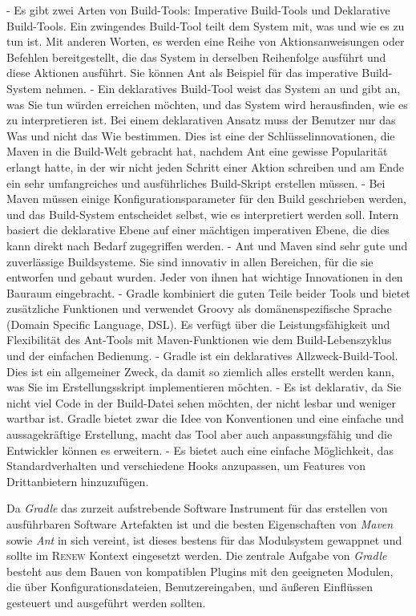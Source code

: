 		- Es gibt zwei Arten von Build-Tools: Imperative Build-Tools und Deklarative Build-Tools. Ein zwingendes Build-Tool teilt dem System mit, was und wie es zu tun ist. Mit anderen Worten, es werden eine Reihe von Aktionsanweisungen oder Befehlen bereitgestellt, die das System in derselben Reihenfolge ausführt und diese Aktionen ausführt. Sie können Ant als Beispiel für das imperative Build-System nehmen. 
		- Ein deklaratives Build-Tool weist das System an und gibt an, was Sie tun würden erreichen möchten, und das System wird herausfinden, wie es zu interpretieren ist. Bei einem deklarativen Ansatz muss der Benutzer nur das Was und nicht das Wie bestimmen. Dies ist eine der Schlüsselinnovationen, die Maven in die Build-Welt gebracht hat, nachdem Ant eine gewisse Popularität erlangt hatte, in der wir nicht jeden Schritt einer Aktion schreiben und am Ende ein sehr umfangreiches und ausführliches Build-Skript erstellen müssen. 
		- Bei Maven müssen einige Konfigurationsparameter für den Build geschrieben werden, und das Build-System entscheidet selbst, wie es interpretiert werden soll. Intern basiert die deklarative Ebene auf einer mächtigen imperativen Ebene, die dies kann direkt nach Bedarf zugegriffen werden. 
		- Ant und Maven sind sehr gute und zuverlässige Buildsysteme. Sie sind innovativ in allen Bereichen, für die sie entworfen und gebaut wurden. Jeder von ihnen hat wichtige Innovationen in den Bauraum eingebracht. 
		- Gradle kombiniert die guten Teile beider Tools und bietet zusätzliche Funktionen und verwendet Groovy als domänenspezifische Sprache (Domain Specific Language, DSL). Es verfügt über die Leistungsfähigkeit und Flexibilität des Ant-Tools mit Maven-Funktionen wie dem Build-Lebenszyklus und der einfachen Bedienung. 
		- Gradle ist ein deklaratives Allzweck-Build-Tool. Dies ist ein allgemeiner Zweck, da damit so ziemlich alles erstellt werden kann, was Sie im Erstellungsskript implementieren möchten. 
		- Es ist deklarativ, da Sie nicht viel Code in der Build-Datei sehen möchten, der nicht lesbar und weniger wartbar ist. Gradle bietet zwar die Idee von Konventionen und eine einfache und aussagekräftige Erstellung, macht das Tool aber auch anpassungsfähig und die Entwickler können es erweitern. 
		- Es bietet auch eine einfache Möglichkeit, das Standardverhalten und verschiedene Hooks anzupassen, um Features von Drittanbietern hinzuzufügen.


		Da \textit{Gradle} das zurzeit aufstrebende Software Instrument für das erstellen von ausführbaren Software Artefakten ist und die besten Eigenschaften von \textit{Maven} sowie \textit{Ant} in sich vereint, ist dieses bestens für das Modulsystem gewappnet und sollte im \textsc{Renew} Kontext eingesetzt werden. \bigbreak
	    Die zentrale Aufgabe von \textit{Gradle} besteht aus dem Bauen von kompatiblen Plugins mit den geeigneten Modulen, die über Konfigurationsdateien, Benutzereingaben, und äußeren Einflüssen gesteuert und ausgeführt werden sollten.

